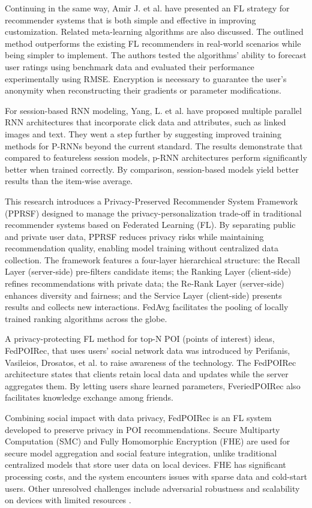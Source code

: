 Continuing in the same way, Amir J. et al. have presented an FL strategy for recommender systems that is both simple and effective in improving customization. Related meta-learning algorithms are also discussed. The outlined method outperforms the existing FL recommenders in real-world scenarios while being simpler to implement. The authors tested the algorithms' ability to forecast user ratings using benchmark data and evaluated their performance experimentally using RMSE. Encryption is necessary to guarantee the user's anonymity when reconstructing their gradients or parameter modifications. \cite{ref31}

For session-based RNN modeling, Yang, L. et al. have proposed multiple parallel RNN architectures that incorporate click data and attributes, such as linked images and text. They went a step further by suggesting improved training methods for P-RNNs beyond the current standard. The results demonstrate that compared to featureless session models, p-RNN architectures perform significantly better when trained correctly. By comparison, session-based models yield better results than the item-wise average.\cite{ref32}

This research introduces a Privacy-Preserved Recommender System Framework (PPRSF) designed to manage the privacy-personalization trade-off in traditional recommender systems based on Federated Learning (FL). By separating public and private user data, PPRSF reduces privacy risks while maintaining recommendation quality, enabling model training without centralized data collection. The framework features a four-layer hierarchical structure: the Recall Layer (server-side) pre-filters candidate items; the Ranking Layer (client-side) refines recommendations with private data; the Re-Rank Layer (server-side) enhances diversity and fairness; and the Service Layer (client-side) presents results and collects new interactions. FedAvg facilitates the pooling of locally trained ranking algorithms across the globe.

A privacy-protecting FL method for top-N POI (points of interest) ideas, FedPOIRec, that uses users' social network data was introduced by Perifanis, Vasileios, Drosatos, et al. to raise awareness of the technology. The FedPOIRec architecture states that clients retain local data and updates while the server aggregates them. By letting users share learned parameters, FveriedPOIRec also facilitates knowledge exchange among friends. \cite{ref32}

Combining social impact with data privacy, FedPOIRec is an FL system developed to preserve privacy in POI recommendations. Secure Multiparty Computation (SMC) and Fully Homomorphic Encryption (FHE) are used for secure model aggregation and social feature integration, unlike traditional centralized models that store user data on local devices. FHE has significant processing costs, and the system encounters issues with sparse data and cold-start users. Other unresolved challenges include adversarial robustness and scalability on devices with limited resources \cite{ref32} \cite{ref34}.

